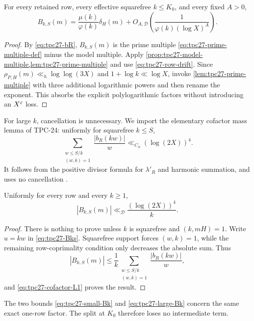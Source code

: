 \begin{corollary}
\label{cor:tpc27-small-Bk}
For every retained row, every effective squarefree \(k\le K_0\), and
every fixed \(A>0\),
\begin{equation}
 \boxed{
 B_{k,S}(m)
 =\frac{\mu(k)}{\varphi(k)}\delta_H(m)
 +O_{A,\mathscr D}\!\left(
 \frac1{\varphi(k)(\log X)^A}
 \right).}
 \label{eq:tpc27-small-Bk}
\end{equation}
\end{corollary}

\begin{proof}
By \eqref{eq:tpc27-bR}, \(B_{k,S}(m)\) is the prime multiple
\eqref{eq:tpc27-prime-multiple-def} minus the model multiple.  Apply
\cref{prop:tpc27-model-multiple,lem:tpc27-prime-multiple} and use
\eqref{eq:tpc27-row-drift}.  Since
\(\rho_{P,H}(m)\ll_h\log\log(3X)\) and
\(1+\log k\ll\log X\), invoke
\cref{lem:tpc27-prime-multiple} with three additional logarithmic
powers and then rename the exponent.  This absorbs the explicit
polylogarithmic factors without introducing an \(X^\varepsilon\) loss.
\end{proof}

For large \(k\), cancellation is unnecessary.  We import the elementary
cofactor mass lemma of TPC-24: uniformly for squarefree \(k\le S\),
\begin{equation}
 \sum_{\substack{w\le S/k\\(w,k)=1}}
 \frac{|b_R(kw)|}{w}
 \ll_{C_S}(\log(2X))^4.
 \label{eq:tpc27-cofactor-L1}
\end{equation}
It follows from the positive divisor formula for \(\lambda'_R\) and
harmonic summation, and uses no cancellation
\citep{WangTPC24}.

\begin{lemma}
\label{lem:tpc27-large-Bk}
Uniformly for every row and every \(k\ge1\),
\begin{equation}
 \boxed{
 |B_{k,S}(m)|\ll_{\mathscr D}
 \frac{(\log(2X))^4}{k}.}
 \label{eq:tpc27-large-Bk}
\end{equation}
\end{lemma}

\begin{proof}
There is nothing to prove unless \(k\) is squarefree and
\((k,mH)=1\).  Write \(u=kw\) in \eqref{eq:tpc27-Bks}.  Squarefree
support forces \((w,k)=1\), while the remaining row-coprimality
condition only decreases the absolute sum.  Thus
\begin{equation*}
 |B_{k,S}(m)|
 \le\frac1k
 \sum_{\substack{w\le S/k\\(w,k)=1}}
 \frac{|b_R(kw)|}{w},
\end{equation*}
and \eqref{eq:tpc27-cofactor-L1} proves the result.
\end{proof}

The two bounds \eqref{eq:tpc27-small-Bk} and
\eqref{eq:tpc27-large-Bk} concern the same exact one-row factor.  The
split at \(K_0\) therefore loses no intermediate term.
